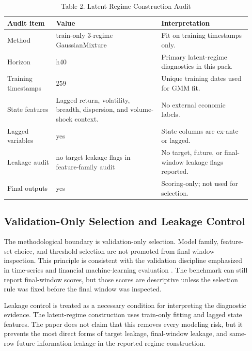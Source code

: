 \documentclass[12pt,a4paper]{article}
\begin{document}
\begin{table}[H]
\centering
\caption{Table 2. Latent-Regime Construction Audit}
\label{tab:regime-construction}
\small
\begin{adjustbox}{width=\textwidth}
\begin{tabular}{L{0.23\textwidth} L{0.32\textwidth} L{0.40\textwidth}}
\toprule
Audit item & Value & Interpretation \\
\midrule
Method & train-only 3-regime GaussianMixture & Fit on training timestamps only. \\
Horizon & h40 & Primary latent-regime diagnostics in this pack. \\
Training timestamps & 259 & Unique training dates used for GMM fit. \\
State features & Lagged return, volatility, breadth, dispersion, and volume-shock context. & No external economic labels. \\
Lagged variables & yes & State columns are ex-ante or lagged. \\
Leakage audit & no target leakage flags in feature-family audit & No target, future, or final-window leakage flags reported. \\
Final outputs & yes & Scoring-only; not used for selection. \\
\bottomrule
\end{tabular}
\end{adjustbox}
\end{table}

\subsection{Validation-Only Selection and Leakage Control}

The methodological boundary is validation-only selection. Model family, feature-set choice, and threshold selection are not promoted from final-window inspection. This principle is consistent with the validation discipline emphasized in time-series and financial machine-learning evaluation \citep{BergmeirBenitez2012,LopezDePrado2018}. The benchmark can still report final-window scores, but those scores are descriptive unless the selection rule was fixed before the final window was inspected.

Leakage control is treated as a necessary condition for interpreting the diagnostic evidence. The latent-regime construction uses train-only fitting and lagged state features. The paper does not claim that this removes every modeling risk, but it prevents the most direct forms of target leakage, final-window leakage, and same-row future information leakage in the reported regime construction.
\end{document}
